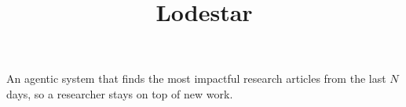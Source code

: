 \documentclass{article}
\title{Lodestar}
\author{}
\date{}
\begin{document}
\maketitle

An agentic system that finds the most impactful research articles
from the last $N$ days, so a researcher stays on top of new work.
\end{document}

